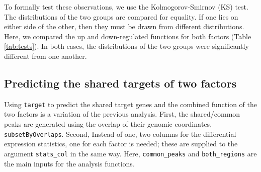 \documentclass[9pt,a4paper,]{extarticle}
\newenvironment{Shaded}{\begin{snugshade}}{\end{snugshade}}
\newcommand{\CommentTok}[1]{\textcolor[rgb]{0.56,0.35,0.01}{\textit{#1}}}
\newcommand{\DataTypeTok}[1]{\textcolor[rgb]{0.13,0.29,0.53}{#1}}
\newcommand{\DecValTok}[1]{\textcolor[rgb]{0.00,0.00,0.81}{#1}}
\newcommand{\KeywordTok}[1]{\textcolor[rgb]{0.13,0.29,0.53}{\textbf{#1}}}
\newcommand{\NormalTok}[1]{#1}
\newcommand{\OperatorTok}[1]{\textcolor[rgb]{0.81,0.36,0.00}{\textbf{#1}}}
\newcommand{\OtherTok}[1]{\textcolor[rgb]{0.56,0.35,0.01}{#1}}
\newcommand{\StringTok}[1]{\textcolor[rgb]{0.31,0.60,0.02}{#1}}
\begin{document}
To formally test these observations, we use the Kolmogorov-Smirnov (KS) test. The distributions of the two groups are compared for equality. If one lies on either side of the other, then they must be drawn from different distributions. Here, we compared the up and down-regulated functions for both factors (Table \ref{tab:tests}). In both cases, the distributions of the two groups were significantly different from one another.

\hypertarget{predicting-the-shared-targets-of-two-factors}{%
\subsection{Predicting the shared targets of two factors}\label{predicting-the-shared-targets-of-two-factors}}

Using \texttt{target} to predict the shared target genes and the combined function of the two factors is a variation of the previous analysis. First, the shared/common peaks are generated using the overlap of their genomic coordinates, \texttt{subsetByOverlaps}. Second, Instead of one, two columns for the differential expression statistics, one for each factor is needed; these are supplied to the argument \texttt{stats\_col} in the same way. Here, \texttt{common\_peaks} and \texttt{both\_regions} are the main inputs for the analysis functions.

\begin{Shaded}
\end{Shaded}

\begin{Shaded}
\end{Shaded}
\end{document}
